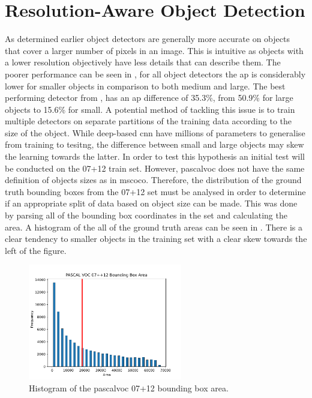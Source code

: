 \section{Resolution-Aware Object Detection}\label{sec:resawareSec}
As determined earlier object detectors are generally more accurate on objects that cover a larger number of pixels in an image. This is intuitive as objects with a lower resolution objectively have less details that can describe them. The poorer performance can be seen in , for all object detectors the \gls{ap} is considerably lower for smaller objects in comparison to both medium and large. The best performing detector from \cite{deepres}, has an \gls{ap} difference of 35.3\%, from 50.9\% for large objects to 15.6\% for small. 
A potential method of tackling this issue is to train multiple detectors on separate partitions of the training data according to the size of the object. While deep-based \gls{cnn} have millions of parameters to generalise from training to tesitng, the difference between small and large objects may skew the learning towards the latter. In order to test this hypothesis an initial test will be conducted on the 07+12 train set. However, \gls{pascalvoc} does not have the same definition of objects sizes as in \gls{mscoco}. Therefore, the distribution of the ground truth bounding boxes from the 07+12 set must be analysed in order to determine if an appropriate split of data based on object size can be made. This was done by parsing all of the bounding box coordinates in the set and calculating the area. A histogram of the all of the ground truth areas can be seen in . There is a clear tendency to smaller objects in the training set with a clear skew towards the left of the figure.

\begin{figure}[H]
  \centering
    \includegraphics[width=0.6\textwidth]{Figs/Implementation/0712histred.pdf}
      \caption{Histogram of the \gls{pascalvoc} 07+12 bounding box area.}
    \label{fig:0712hist}
\end{figure}

